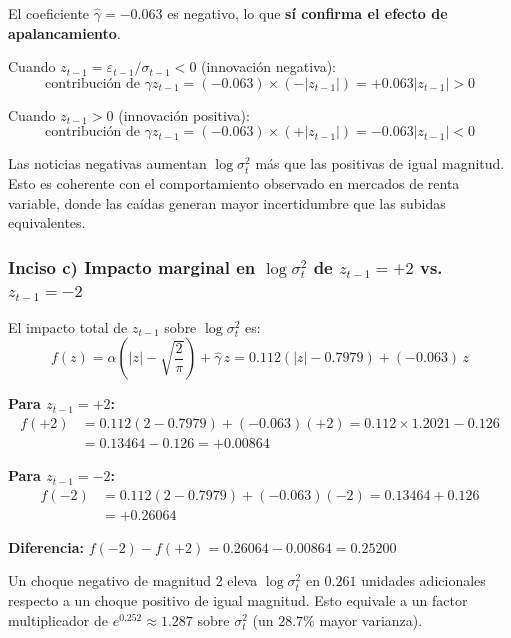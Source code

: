 \documentclass[12pt,a4paper]{article}
\begin{document}
\begin{solucion}
El coeficiente $\hat{\gamma}=-0.063$ es negativo, lo que \textbf{sí confirma el efecto de apalancamiento}.

Cuando $z_{t-1}=\varepsilon_{t-1}/\sigma_{t-1}<0$ (innovación negativa):
\begin{equation}
\text{contribución de }\gamma z_{t-1} = (-0.063)\times(-|z_{t-1}|) = +0.063|z_{t-1}| > 0
\end{equation}

Cuando $z_{t-1}>0$ (innovación positiva):
\begin{equation}
\text{contribución de }\gamma z_{t-1} = (-0.063)\times(+|z_{t-1}|) = -0.063|z_{t-1}| < 0
\end{equation}

Las noticias negativas aumentan $\log\sigma_t^2$ más que las positivas de igual magnitud. Esto es coherente con el comportamiento observado en mercados de renta variable, donde las caídas generan mayor incertidumbre que las subidas equivalentes.
\end{solucion}

\subsubsection*{Inciso c) Impacto marginal en $\log\sigma_t^2$ de $z_{t-1}=+2$ vs.\ $z_{t-1}=-2$}

\begin{solucion}
El impacto total de $z_{t-1}$ sobre $\log\sigma_t^2$ es:
\begin{equation}
f(z) = \hat{\alpha}\left(|z|-\sqrt{\frac{2}{\pi}}\right) + \hat{\gamma}\,z
= 0.112\left(|z|-0.7979\right) + (-0.063)\,z
\end{equation}

\textbf{Para $z_{t-1}=+2$:}
\begin{align*}
f(+2) &= 0.112(2-0.7979) + (-0.063)(+2) = 0.112\times1.2021 - 0.126\\
&= 0.13464 - 0.126 = +0.00864
\end{align*}

\textbf{Para $z_{t-1}=-2$:}
\begin{align*}
f(-2) &= 0.112(2-0.7979) + (-0.063)(-2) = 0.13464 + 0.126\\
&= +0.26064
\end{align*}

\textbf{Diferencia:} $f(-2)-f(+2)=0.26064-0.00864=0.25200$

Un choque negativo de magnitud 2 eleva $\log\sigma_t^2$ en $0.261$ unidades adicionales respecto a un choque positivo de igual magnitud. Esto equivale a un factor multiplicador de $e^{0.252}\approx1.287$ sobre $\sigma_t^2$ (un $28.7\%$ mayor varianza).
\end{solucion}
\end{document}
